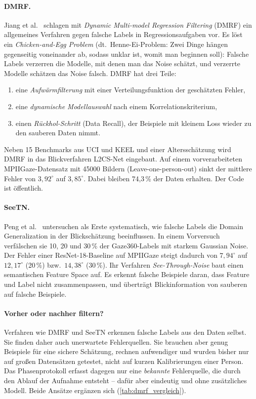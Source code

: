 \paragraph{DMRF.}
Jiang et al.~\cite{jiang2026dmrf} schlagen mit \emph{Dynamic Multi-model
Regression Filtering} (DMRF) ein allgemeines Verfahren gegen falsche Labels in
Regressionsaufgaben vor. Es löst ein \emph{Chicken-and-Egg Problem} (dt.\ Henne-Ei-Problem: Zwei
Dinge hängen gegenseitig voneinander ab, sodass unklar ist, womit man
beginnen soll): Falsche Labels verzerren
die Modelle, mit denen man das Noise schätzt, und verzerrte Modelle schätzen
das Noise falsch. DMRF hat drei Teile:
\begin{enumerate}
  \item eine \emph{Aufwärmfilterung} mit einer Verteilungsfunktion der
        geschätzten Fehler,
  \item eine \emph{dynamische Modellauswahl} nach einem
        Korrelationskriterium,
  \item einen \emph{Rückhol-Schritt} (Data Recall), der Beispiele mit kleinem
        Loss wieder zu den sauberen Daten nimmt.
\end{enumerate}
Neben 15 Benchmarks aus UCI und KEEL und einer Altersschätzung wird DMRF in das
Blickverfahren L2CS-Net eingebaut. Auf einem vorverarbeiteten
MPIIGaze-Datensatz mit \num{45000} Bildern (Leave-one-person-out) sinkt der
mittlere Fehler von $3,92^\circ$ auf $3,85^\circ$. Dabei bleiben 74,3\,\% der
Daten erhalten. Der Code ist öffentlich.

\paragraph{SeeTN.}
Peng et al.~\cite{peng2026seetn} untersuchen als Erste systematisch, wie
falsche Labels die Domain Generalization in der Blickschätzung beeinflussen.
In einem Vorversuch verfälschen sie 10, 20 und 30\,\% der Gaze360-Labels mit
starkem Gaussian Noise. Der Fehler einer ResNet-18-Baseline auf MPIIGaze steigt
dadurch von $7,94^\circ$ auf $12,17^\circ$ (20\,\%) bzw.\ $14,38^\circ$
(30\,\%). Ihr Verfahren \emph{See-Through-Noise} baut einen semantischen
Feature Space auf. Es erkennt falsche Beispiele daran, dass Feature und Label
nicht zusammenpassen, und überträgt Blickinformation von sauberen auf falsche
Beispiele.

\paragraph{Vorher oder nachher filtern?}
Verfahren wie DMRF und SeeTN erkennen falsche Labels aus den Daten selbst. Sie
finden daher auch unerwartete Fehlerquellen. Sie brauchen aber genug Beispiele
für eine sichere Schätzung, rechnen aufwendiger und wurden bisher nur auf
großen Datensätzen getestet, nicht auf kurzen Kalibrierungen einer Person. Das
Phasenprotokoll erfasst dagegen nur eine \emph{bekannte} Fehlerquelle, die
durch den Ablauf der Aufnahme entsteht -- dafür aber eindeutig und ohne
zusätzliches Modell. Beide Ansätze ergänzen sich (\cref{tab:dmrf_vergleich}).

